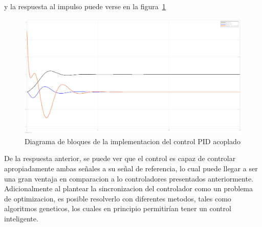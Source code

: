 y la respuesta al impulso puede verse en la figura~\ref{fig:controlS}
\begin{figure}[t]
  \label{fig:controlS}
  \includegraphics[scale=0.15]{Figuras/controlS}
  \caption{Diagrama de bloques de la implementacion del control PID acoplado} 
\end{figure}

De la respuesta anterior, se puede ver que el control es capaz de controlar apropiadamente ambas
señales a su señal de referencia, lo cual puede llegar a ser una gran ventaja en comparacion
a lo controladores presentados anteriormente. Adicionalmente al plantear la sincronizacion del
controlador como un problema de optimizacion, es posible resolverlo con diferentes metodos, tales
como algoritmos geneticos, los cuales en principio permitirían tener un control inteligente.